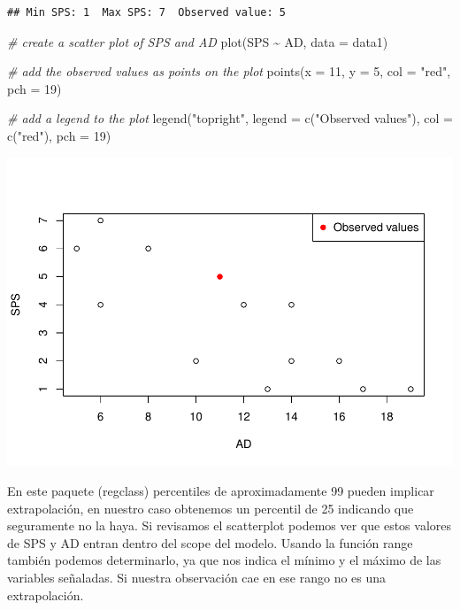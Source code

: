 \documentclass[
]{article}
\newenvironment{Shaded}{\begin{snugshade}}{\end{snugshade}}
\newcommand{\AttributeTok}[1]{\textcolor[rgb]{0.77,0.63,0.00}{#1}}
\newcommand{\CommentTok}[1]{\textcolor[rgb]{0.56,0.35,0.01}{\textit{#1}}}
\newcommand{\DecValTok}[1]{\textcolor[rgb]{0.00,0.00,0.81}{#1}}
\newcommand{\FunctionTok}[1]{\textcolor[rgb]{0.00,0.00,0.00}{#1}}
\newcommand{\NormalTok}[1]{#1}
\newcommand{\SpecialCharTok}[1]{\textcolor[rgb]{0.00,0.00,0.00}{#1}}
\newcommand{\StringTok}[1]{\textcolor[rgb]{0.31,0.60,0.02}{#1}}
\begin{document}
\begin{verbatim}
## Min SPS: 1  Max SPS: 7  Observed value: 5
\end{verbatim}

\begin{Shaded}
\begin{Highlighting}[]
\CommentTok{\# create a scatter plot of SPS and AD}
\FunctionTok{plot}\NormalTok{(SPS }\SpecialCharTok{\textasciitilde{}}\NormalTok{ AD, }\AttributeTok{data =}\NormalTok{ data1)}

\CommentTok{\# add the observed values as points on the plot}
\FunctionTok{points}\NormalTok{(}\AttributeTok{x =} \DecValTok{11}\NormalTok{, }\AttributeTok{y =} \DecValTok{5}\NormalTok{, }\AttributeTok{col =} \StringTok{"red"}\NormalTok{, }\AttributeTok{pch =} \DecValTok{19}\NormalTok{)}

\CommentTok{\# add a legend to the plot}
\FunctionTok{legend}\NormalTok{(}\StringTok{"topright"}\NormalTok{, }\AttributeTok{legend =} \FunctionTok{c}\NormalTok{(}\StringTok{"Observed values"}\NormalTok{), }\AttributeTok{col =} \FunctionTok{c}\NormalTok{(}\StringTok{"red"}\NormalTok{), }\AttributeTok{pch =} \DecValTok{19}\NormalTok{)}
\end{Highlighting}
\end{Shaded}

\includegraphics{code_files/figure-latex/unnamed-chunk-8-1.pdf}

En este paquete (regclass) percentiles de aproximadamente 99 pueden
implicar extrapolación, en nuestro caso obtenemos un percentil de 25
indicando que seguramente no la haya. Si revisamos el scatterplot
podemos ver que estos valores de SPS y AD entran dentro del scope del
modelo. Usando la función range también podemos determinarlo, ya que nos
indica el mínimo y el máximo de las variables señaladas. Si nuestra
observación cae en ese rango no es una extrapolación.
\end{document}
